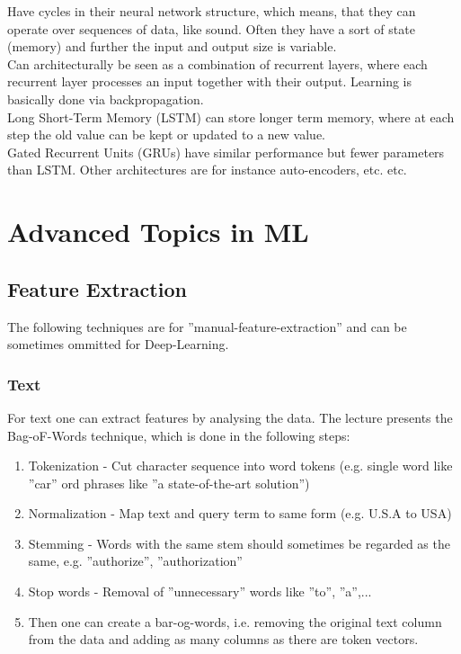 \documentclass[12pt,a4paper]{article}
\begin{document}
\noindent Have cycles in their neural network structure, which means, that they can operate over sequences of data, like sound. Often they have a sort of state (memory) and further the input and output size is variable.\\
Can architecturally be seen as a combination of recurrent layers, where each recurrent layer processes an input together with their output. Learning is basically done via backpropagation.\\[1em]
Long Short-Term Memory (LSTM) can store longer term memory, where at each step the old value can be kept or updated to a new value.\\
Gated Recurrent Units (GRUs) have similar performance but fewer parameters than LSTM. Other architectures are for instance auto-encoders, etc. etc.


\newpage
\section{Advanced Topics in ML}

\subsection{Feature Extraction}
\label{subsec:feature-extraction}

\noindent The following techniques are for ''manual-feature-extraction'' and can be sometimes ommitted for Deep-Learning.

\subsubsection{Text}

\noindent For text one can extract features by analysing the data. The lecture presents the Bag-oF-Words technique, which is done in the following steps:

\begin{enumerate}
    \item Tokenization - Cut character sequence into word tokens (e.g. single word like ''car'' ord phrases like ''a state-of-the-art solution'')
    \item Normalization - Map text and query term to same form (e.g. U.S.A to USA)
    \item Stemming - Words with the same stem should sometimes be regarded as the same, e.g. ''authorize'', ''authorization''
    \item Stop words - Removal of ''unnecessary'' words like ''to'', ''a'',...
    \item Then one can create a bar-og-words, i.e. removing the original text column from the data and adding as many columns as there are token vectors.
\end{enumerate}
\end{document}
